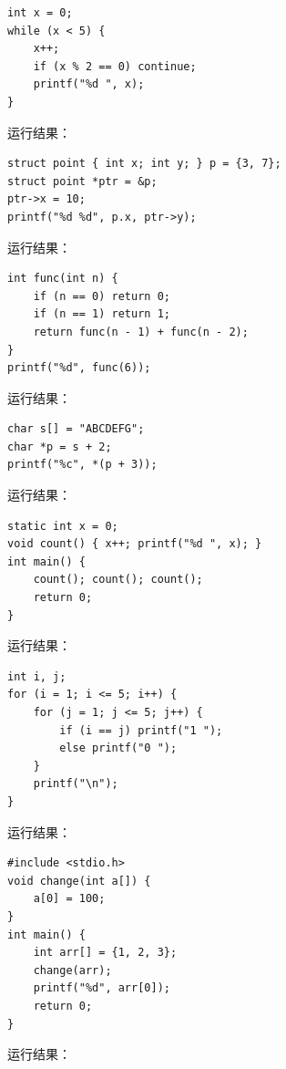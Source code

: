 \documentclass[a4paper,11pt]{article}
\begin{document}
\q
\begin{lstlisting}[language={[custom]C}]
int x = 0;
while (x < 5) {
    x++;
    if (x % 2 == 0) continue;
    printf("%d ", x);
}
\end{lstlisting}
运行结果：\underline{\hspace{3cm}}


\q
\begin{lstlisting}[language={[custom]C}]
struct point { int x; int y; } p = {3, 7};
struct point *ptr = &p;
ptr->x = 10;
printf("%d %d", p.x, ptr->y);
\end{lstlisting}
运行结果：\underline{\hspace{3cm}}


\q
\begin{lstlisting}[language={[custom]C}]
int func(int n) {
    if (n == 0) return 0;
    if (n == 1) return 1;
    return func(n - 1) + func(n - 2);
}
printf("%d", func(6));
\end{lstlisting}
运行结果：\underline{\hspace{3cm}}


\q
\begin{lstlisting}[language={[custom]C}]
char s[] = "ABCDEFG";
char *p = s + 2;
printf("%c", *(p + 3));
\end{lstlisting}
运行结果：\underline{\hspace{3cm}}


\q
\begin{lstlisting}[language={[custom]C}]
static int x = 0;
void count() { x++; printf("%d ", x); }
int main() {
    count(); count(); count();
    return 0;
}
\end{lstlisting}
运行结果：\underline{\hspace{3cm}}


\q
\begin{lstlisting}[language={[custom]C}]
int i, j;
for (i = 1; i <= 5; i++) {
    for (j = 1; j <= 5; j++) {
        if (i == j) printf("1 ");
        else printf("0 ");
    }
    printf("\n");
}
\end{lstlisting}
运行结果：\underline{\hspace{3cm}}


\q
\begin{lstlisting}[language={[custom]C}]
#include <stdio.h>
void change(int a[]) {
    a[0] = 100;
}
int main() {
    int arr[] = {1, 2, 3};
    change(arr);
    printf("%d", arr[0]);
    return 0;
}
\end{lstlisting}
运行结果：\underline{\hspace{3cm}}
\end{document}

